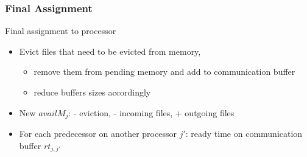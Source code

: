 \documentclass[xcolor=svgnames,titlepage,english,presentation]{beamer}
\begin{document}
\begin{frame}[t]
    \begin{overlayarea}{\paperwidth}{\paperheight}
    \end{overlayarea}

\end{frame}

\begin{frame}[t]
    \frametitle{Final Assignment}


    Final assignment to processor

    \begin{itemize}
        \item Evict files that need to be evicted from memory,
        \begin{itemize}
            \item  remove them from pending memory and add to communication buffer
            \item reduce buffers sizes accordingly
        \end{itemize}
        \item New $availM_j$: - eviction, - incoming files, + outgoing files
        \item For each predecessor on another processor $j'$: ready time on communication buffer $rt_{j, j'}$

    \end{itemize}

\end{frame}

\end{document}
